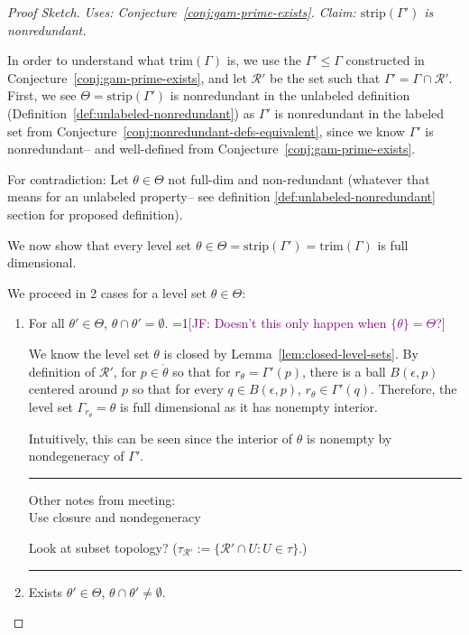 \documentclass[12pt]{article}
\newcommand{\Comments}{1}
\newcommand{\mynote}[2]{\ifnum\Comments=1\textcolor{#1}{#2}\fi}
\newcommand{\jessie}[1]{\mynote{purple}{[JF: #1]}}
\newcommand{\R}{\mathcal{R}}
\newcommand{\inter}[1]{\mathring{#1}}%
\newcommand{\trim}{\mathrm{trim}}
\newcommand{\strip}{\text{strip}}
\begin{document}
\begin{proof}[Proof Sketch]
	\emph{Uses: Conjecture~\ref{conj:gam-prime-exists}.  Claim: $\strip(\Gamma')$ is nonredundant.}
	
	In order to understand what $\trim(\Gamma)$ is, we use the $\Gamma' \leq \Gamma$ constructed in Conjecture~\ref{conj:gam-prime-exists}, and let $\R'$ be the set such that $\Gamma' = \Gamma\cap \R'$.
	First, we see $\Theta = \strip(\Gamma')$ is nonredundant in the unlabeled definition (Definition~\ref{def:unlabeled-nonredundant}) as $\Gamma'$ is nonredundant in the labeled set from Conjecture~\ref{conj:nonredundant-defs-equivalent}, since we know $\Gamma'$ is nonredundant-- and well-defined from Conjecture~\ref{conj:gam-prime-exists}.
	
	
	
	For contradiction:
	Let $\theta \in \Theta$ not full-dim and non-redundant (whatever that means for an unlabeled property-- see definition \ref{def:unlabeled-nonredundant} section for proposed definition).
	
	We now show that every level set $\theta \in \Theta = \strip(\Gamma') = \trim(\Gamma)$ is full dimensional.
	
	We proceed in 2 cases for a level set $\theta \in \Theta$:
	\begin{enumerate}
		\item For all $\theta' \in \Theta$, $\theta \cap \theta' = \emptyset$.
		\jessie{Doesn't this only happen when $\{\theta\} = \Theta$?}
		
		We know the level set $\theta$ is closed by Lemma~\ref{lem:closed-level-sets}.
		By definition of $\R'$, for $p \in \inter{\theta}$ so that for $r_\theta = \Gamma'(p)$, there is a ball $B(\epsilon, p)$ centered around $p$ so that for every $q \in B(\epsilon, p)$, $r_\theta \in \Gamma'(q)$.
		Therefore, the level set $\Gamma_{r_\theta} = \theta$ is full dimensional as it has nonempty interior.
		
		Intuitively, this can be seen since the interior of $\theta$ is nonempty by nondegeneracy of $\Gamma'$.
		
		\bigskip
		\hrule
		Other notes from meeting:\\
		Use closure and nondegeneracy
		
		Look at subset topology? ($\tau_{\R'} := \{\R' \cap U : U \in \tau \}$.)
		
		\hrule
		\item Exists $\theta' \in \Theta$, $\theta \cap \theta' \neq \emptyset$.
		

\end{enumerate}
\end{proof}
\end{document}
